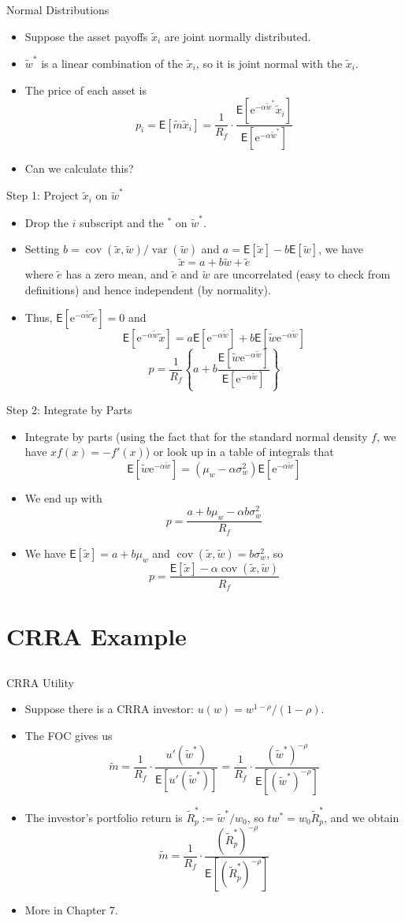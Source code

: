 \documentclass[10pt]{beamer}
\DeclareMathOperator{\var}{var}
\DeclareMathOperator{\cov}{cov}
\newcommand{\bi}{\begin{itemize}}
\newcommand{\ei}{\end{itemize}}
\newcommand{\im}{\item}
\newcommand{\E}{\mathrm{e}}
\newcommand{\mye}{\ensuremath{\mathsf{E}}}
\newcommand{\tw}{\tilde{w}}
\newcommand{\te}{\tilde{e}}
\newcommand{\tx}{\tilde{x}}
\newcommand{\tm}{\tilde{m}}
\newcommand{\tr}{\widetilde{R}}
\begin{document}
\begin{frame}{Normal Distributions}
    \bi 
    \im Suppose the asset payoffs $\tx_i$ are joint normally distributed.
    \im $\tw^*$ is a linear combination of the $\tx_i$, so it is joint normal with the $\tx_i$.
   \im The price of each asset is 
   $$p_i = \mye[\tm \tx_i] = \frac{1}{R_f} \cdot \frac{\mye[\E^{-\alpha \tw^*}\tx_i]}{\mye[\E^{-\alpha \tw^*}]}$$
   \im Can we calculate this?
   \ei
\end{frame}


\begin{frame}{Step 1: Project $\tx_i$ on $\tw^*$}
    \bi 
    \im Drop the $i$ subscript and the $^*$ on $\tw^*$.
    \im Setting $b=\cov(\tx,\tw)/\var(\tw)$ and $a=\mye[\tx]-b\mye[\tw]$, we have
    $$\tx = a + b\tw + \te$$
    where $\te$ has a zero mean, and $\te$ and $\tw$ are uncorrelated (easy to check from definitions) and hence independent (by normality).
    \im Thus, $\mye[\E^{-\alpha \tw}\te] = 0$ and
    $$\mye[\E^{-\alpha \tw}\tx] = a\mye[\E^{-\alpha \tw}] + b\mye[\tw \E^{-\alpha \tw}]$$
    $$p = \frac{1}{R_f}\left\{a + b \frac{\mye[\tw \E^{-\alpha \tw}]}{\mye[\E^{-\alpha \tw}]}\right\}$$
    \ei
\end{frame}

\begin{frame}{Step 2: Integrate by Parts}
    \bi
    \im Integrate by parts (using the fact that for the standard normal density $f$, we have $xf(x) = - f'(x)$) or look up in a table of integrals that
    $$\mye[\tw \E^{-\alpha \tw}] = (\mu_w-\alpha \sigma_w^2)\mye[\E^{-\alpha \tw}]$$
    \im We end up with 
    $$p = \frac{a + b \mu_w - \alpha b \sigma_w^2}{R_f}$$
    \im We have $\mye[\tx] = a + b \mu_w$ and $\cov(\tx, \tw) = b\sigma_w^2$, so
    $$p = \frac{\mye[\tx] - \alpha \cov(\tx,\tw)}{R_f}$$
    \ei
    \end{frame}

  
\section{CRRA Example}
\subsection{}

\begin{frame}{CRRA Utility}
    \bi
\im Suppose there is a CRRA investor: $u(w) = w^{1-\rho}/(1-\rho)$.
\im The FOC gives us 
$$\tm =  \frac{1}{R_f} \cdot \frac{u'(\tw^*)}{\mye[u'(\tw^*)]} = \frac{1}{R_f} \cdot \frac{(\tw^*)^{-\rho}}{\mye[(\tw^*)^{-\rho}]}$$
\im The investor's portfolio return is $\tr^*_p := \tw^*/w_0$, so $tw^* = w_0 \tr^*_p$, and we obtain
$$\tm = \frac{1}{R_f} \cdot \frac{(\tr_p^*)^{-\rho}}{\mye[(\tr_p^*)^{-\rho}]}$$
\im More in Chapter 7.
\ei 
\end{frame}
\end{document}
